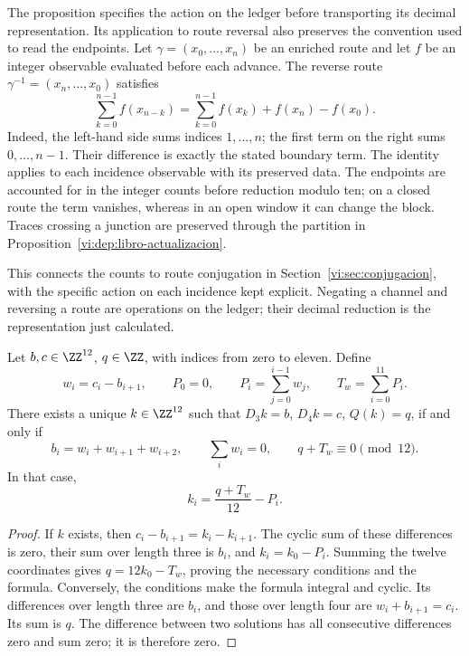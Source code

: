 The proposition specifies the action on the ledger before transporting
its decimal representation. Its application to route reversal
also preserves the convention used to read the endpoints. Let
\(\gamma=(x_0,\ldots,x_n)\) be an enriched route and let \(f\) be an
integer observable evaluated before each advance. The reverse route
\(\gamma^{-1}=(x_n,\ldots,x_0)\) satisfies
\begin{equation}
 \sum_{k=0}^{n-1}f(x_{n-k})
 =\sum_{k=0}^{n-1}f(x_k)+f(x_n)-f(x_0).
 \label{vi:dep:conjugacion-frontera}
\end{equation}
Indeed, the left-hand side sums indices \(1,\ldots,n\);
the first term on the right sums \(0,\ldots,n-1\). Their difference
is exactly the stated boundary term. The identity applies
to each incidence observable with its preserved data. The endpoints
are accounted for in the integer counts before reduction modulo ten;
on a closed route the term vanishes, whereas in an open
window it can change the block. Traces crossing a junction
are preserved through the partition in
Proposition~\ref{vi:dep:libro-actualizacion}.

This connects the counts to route conjugation in
Section~\ref{vi:sec:conjugacion}, with the specific action
on each incidence kept explicit. Negating a channel and reversing
a route are operations on the ledger; their decimal reduction is the
representation just calculated.

\begin{proposition}
\label{vi:dep:imagen-integral}
Let \(b,c\in\ZZ^{12}\), \(q\in\ZZ\), with indices from zero to eleven.
Define
\[
 w_i=c_i-b_{i+1},\qquad P_0=0,\qquad
 P_i=\sum_{j=0}^{i-1}w_j,\qquad T_w=\sum_{i=0}^{11}P_i.
\]
There exists a unique \(k\in\ZZ^{12}\) such that
\(D_3k=b\), \(D_4k=c\), \(Q(k)=q\), if and only if
\begin{equation}
 b_i=w_i+w_{i+1}+w_{i+2},\qquad
 \sum_iw_i=0,\qquad q+T_w\equiv0\pmod{12}.
 \label{vi:dep:condiciones-imagen}
\end{equation}
In that case,
\begin{equation}
 k_i=\frac{q+T_w}{12}-P_i.
 \label{vi:dep:inversa-incidencial}
\end{equation}
\end{proposition}
\begin{proof}
If \(k\) exists, then
\(c_i-b_{i+1}=k_i-k_{i+1}\). The cyclic sum of these differences
is zero, their sum over length three is \(b_i\), and
\(k_i=k_0-P_i\). Summing the twelve coordinates gives
\(q=12k_0-T_w\), proving the necessary conditions and the formula.
Conversely, the conditions make the formula integral and
cyclic. Its differences over length three are \(b_i\), and those over
length four are \(w_i+b_{i+1}=c_i\). Its sum is \(q\).
The difference between two solutions has all consecutive
differences zero and sum zero; it is therefore zero.
\end{proof}

